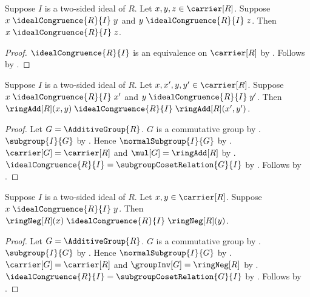 \begin{proposition}\label{ideal_congruence_transitive}
    Suppose $I$ is a two-sided ideal of $R$.
    Let $x,y,z\in\carrier[R]$.
    Suppose $x\mathrel{\idealCongruence{R}{I}}y$ and
        $y\mathrel{\idealCongruence{R}{I}}z$.
    Then $x\mathrel{\idealCongruence{R}{I}}z$.
\end{proposition}
\begin{proof}
    $\idealCongruence{R}{I}$ is an equivalence on $\carrier[R]$ by
        .
    Follows by .
\end{proof}

\begin{theorem}\label{ideal_congruence_addition_congruent}
    Suppose $I$ is a two-sided ideal of $R$.
    Let $x,x',y,y'\in\carrier[R]$.
    Suppose $x\mathrel{\idealCongruence{R}{I}}x'$ and
        $y\mathrel{\idealCongruence{R}{I}}y'$.
    Then
        $\ringAdd[R](x,y)
            \mathrel{\idealCongruence{R}{I}}
        \ringAdd[R](x',y')$.
\end{theorem}
\begin{proof}
    Let $G=\AdditiveGroup{R}$.
    $G$ is a commutative group by
        .
    $\subgroup{I}{G}$ by
        .
    Hence $\normalSubgroup{I}{G}$ by
        .
    $\carrier[G]=\carrier[R]$ and
        $\mul[G]=\ringAdd[R]$ by .
    $\idealCongruence{R}{I}=\subgroupCosetRelation{G}{I}$ by
        .
    Follows by .
\end{proof}

\begin{theorem}\label{ideal_congruence_negation_congruent}
    Suppose $I$ is a two-sided ideal of $R$.
    Let $x,y\in\carrier[R]$.
    Suppose $x\mathrel{\idealCongruence{R}{I}}y$.
    Then
        $\ringNeg[R](x)
            \mathrel{\idealCongruence{R}{I}}
        \ringNeg[R](y)$.
\end{theorem}
\begin{proof}
    Let $G=\AdditiveGroup{R}$.
    $G$ is a commutative group by
        .
    $\subgroup{I}{G}$ by
        .
    Hence $\normalSubgroup{I}{G}$ by
        .
    $\carrier[G]=\carrier[R]$ and
        $\groupInv[G]=\ringNeg[R]$ by .
    $\idealCongruence{R}{I}=\subgroupCosetRelation{G}{I}$ by
        .
    Follows by .
\end{proof}

